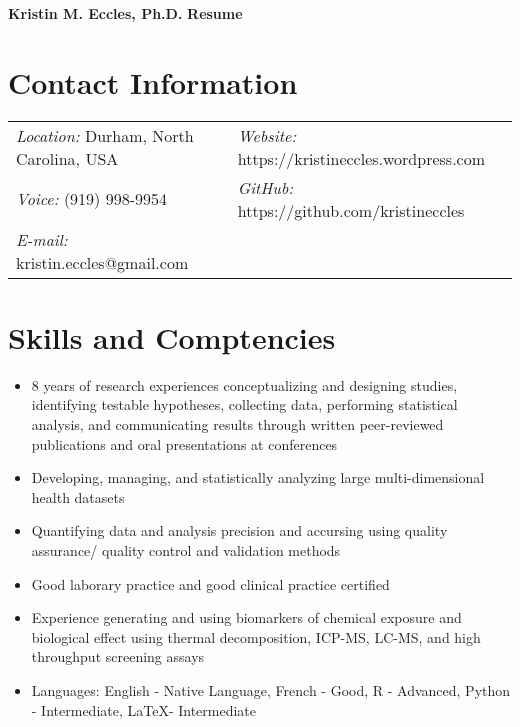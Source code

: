 \documentclass[margin,line]{res}
\begin{document}
\begin{flushleft}
		\huge \textbf{Kristin M. Eccles, Ph.D.}
		\hfill {\LARGE \textbf{Resume}}\\
\end{flushleft}

\begin{resume}

\section{\sc Contact Information}
\vspace{.05in}
\begin{tabular}{@{}p{3.2in}p{2.5in}}
{\it Location:} Durham, North Carolina, USA  &{\it Website:} https://kristineccles.wordpress.com  \\
{\it Voice:}  (919) 998-9954 & {\it GitHub:} https://github.com/kristineccles \\
{\it E-mail:}  kristin.eccles@gmail.com \\

\end{tabular}

\section{\sc Skills and Comptencies}
\begin{itemize}
\item 8 years of  research experiences conceptualizing and designing studies, identifying testable hypotheses, collecting data, performing statistical analysis, and communicating results through written peer-reviewed publications and oral presentations at conferences
\item Developing, managing, and statistically analyzing large multi-dimensional health datasets
\item Quantifying data and analysis precision and accursing using quality assurance/ quality control and validation methods
\item Good laborary practice and good clinical practice certified
\item Experience generating and using biomarkers of chemical exposure and biological effect using thermal decomposition, ICP-MS, LC-MS, and high throughput screening assays
\item Languages: English - Native Language, French - Good, R - Advanced, Python - Intermediate, LaTeX- Intermediate
\end{itemize}


\end{resume}
\end{document}
